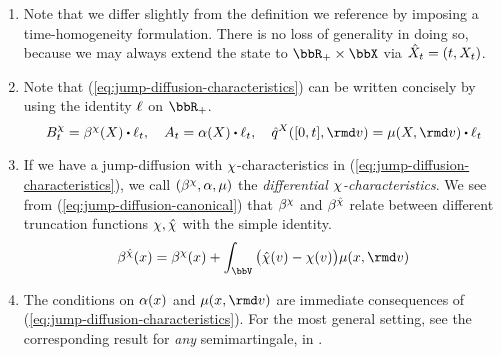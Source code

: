 \begin{remark}
  \label{remark:jump-diffusions}
  \begin{enumerate}[label=(\alph*)]
    \item
      Note that we differ slightly from the definition we reference by imposing a time-homogeneity formulation.
      There is no loss of generality in doing so, because we may always extend the state to $\bbR_+ \times \stateSpace$ via $\hat{X}_t = (t, X_t)$.
    \item
      Note that (\ref{eq:jump-diffusion-characteristics}) can be written concisely by using the identity $\ell$ on $\bbR_+$.
      \[
        B^\trunc_t = \affDrift^\trunc(\X) \shortInt \leb_t, \quad
        A_t = \affDiff(\X) \shortInt \leb_t, \quad
        \predproj{\jumpMeas^\X}([0,t],\rmd\markVar) = \affJump(\X, \rmd\markVar) \shortInt \leb_t
      \]
    \item
      \label{remark:characteristic-switch}
      If we have a jump-diffusion with $\chi$-characteristics in (\ref{eq:jump-diffusion-characteristics}), we call $(\beta^\chi, \alpha, \mu)$ the \emph{differential $\chi$-characteristics}.
      We see from (\ref{eq:jump-diffusion-canonical}) that $\beta^\chi$ and $\beta^{\hat{\chi}}$ relate between different truncation functions $\chi, \hat{\chi}$ with the simple identity.
      \begin{equation}
        \label{eq:affDrift-relationship}
        \affDrift^{\hat\trunc}(\stateVar) = \affDrift^\trunc(\stateVar) + \int_\vecSpace \big(\hat\trunc(\markVar) - \trunc(\markVar) \big) \affJump(\stateVar, \rmd\markVar)
      \end{equation}
    \item
      The conditions on $\alpha(x)$ and $\affJump(\stateVar, \rmd\markVar)$ are immediate consequences of (\ref{eq:jump-diffusion-characteristics}).
      For the most general setting, see the corresponding result for \emph{any} semimartingale, in \cite[Proposition II.2.9]{jacod2003}.
  \end{enumerate}
\end{remark}
